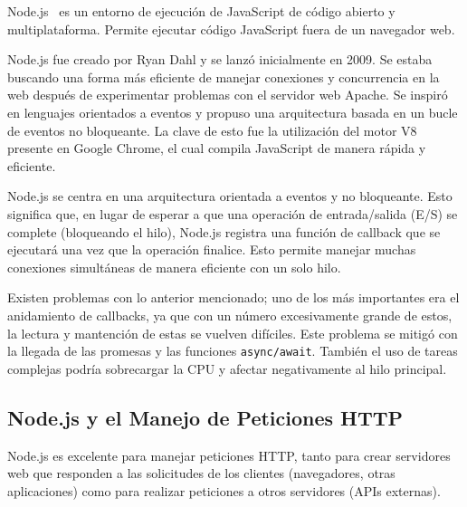 \documentclass[a4paper, 12pt]{book}
\begin{document}
Node.js~\cite{nodejs-docs}\cite{nodejs-github}\cite{nodejs-about-es} es un entorno de ejecución de JavaScript de código abierto y multiplataforma. Permite ejecutar código JavaScript fuera de un navegador web.

Node.js fue creado por Ryan Dahl y se lanzó inicialmente en 2009. Se estaba buscando una forma más eficiente de manejar conexiones y concurrencia en la web después de experimentar problemas con el servidor web Apache. Se inspiró en lenguajes orientados a eventos y propuso una arquitectura basada en un bucle de eventos no bloqueante. La clave de esto fue la utilización del motor V8 presente en Google Chrome, el cual compila JavaScript de manera rápida y eficiente.

Node.js se centra en una arquitectura orientada a eventos y no bloqueante. Esto significa que, en lugar de esperar a que una operación de entrada/salida (E/S) se complete (bloqueando el hilo), Node.js registra una función de callback que se ejecutará una vez que la operación finalice. Esto permite manejar muchas conexiones simultáneas de manera eficiente con un solo hilo.

Existen problemas con lo anterior mencionado; uno de los más importantes era el anidamiento de callbacks, ya que con un número excesivamente grande de estos, la lectura y mantención de estas se vuelven difíciles. Este problema se mitigó con la llegada de las promesas y las funciones \texttt{async/await}. También el uso de tareas complejas podría sobrecargar la CPU y afectar negativamente al hilo principal.

\subsection{Node.js y el Manejo de Peticiones HTTP}

Node.js es excelente para manejar peticiones HTTP, tanto para crear servidores web que responden a las solicitudes de los clientes (navegadores, otras aplicaciones) como para realizar peticiones a otros servidores (APIs externas).
\end{document}
